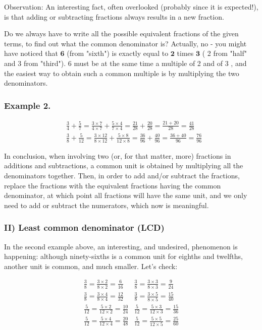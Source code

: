 \documentclass{ximera}
\begin{document}
Observation: An interesting fact, often overlooked (probably since it is expected!), is that adding or subtracting fractions always results in a new fraction.

Do we always have to write all the possible equivalent fractions of the given terms, to find out what the common denominator is? Actually, no - you might have noticed that $\mathbf{6}$ (from "sixth") is exactly equal to $\mathbf{2}$ times $\mathbf{3}$ ( 2 from "half" and 3 from "third"). 6 must be at the same time a multiple of 2 and of 3 , and the easiest way to obtain such a common multiple is by multiplying the two denominators.

\subsubsection*{Example 2.}
$$\begin{aligned}
& \frac{3}{4}+\frac{5}{7}=\frac{3 \times 7}{4 \times 7}+\frac{5 \times 4}{7 \times 4}=\frac{21}{28}+\frac{20}{28}=\frac{21+20}{28}=\frac{41}{28} \\
& \frac{3}{8}+\frac{5}{12}=\frac{3 \times 12}{8 \times 12}+\frac{5 \times 8}{12 \times 8}=\frac{36}{96}+\frac{40}{96}=\frac{36+40}{96}=\frac{76}{96}
\end{aligned}$$

In conclusion, when involving two (or, for that matter, more) fractions in additions and subtractions, a common unit is obtained by multiplying all the denominators together. Then, in order to add and/or subtract the fractions, replace the fractions with the equivalent fractions having the common denominator, at which point all fractions will have the same unit, and we only need to add or subtract the numerators, which now is meaningful.

\subsubsection*{II) Least common denominator (LCD)}
In the second example above, an interesting, and undesired, phenomenon is happening: although ninety-sixths is a common unit for eighths and twelfths, another unit is common, and much smaller. Let's check:

$$\begin{array}{ll}
\frac{3}{8}=\frac{3 \times 2}{8 \times 2}=\frac{6}{16} & \frac{3}{8}=\frac{3 \times 3}{8 \times 3}=\frac{9}{24} \\
\frac{3}{8}=\frac{3 \times 4}{8 \times 4}=\frac{12}{32} & \frac{3}{8}=\frac{3 \times 5}{8 \times 5}=\frac{15}{40} \\
\frac{5}{12}=\frac{5 \times 2}{12 \times 2}=\frac{10}{24} & \frac{5}{12}=\frac{5 \times 3}{12 \times 3}=\frac{15}{36} \\
\frac{5}{12}=\frac{5 \times 4}{12 \times 4}=\frac{20}{48} & \frac{5}{12}=\frac{5 \times 5}{12 \times 5}=\frac{25}{60}
\end{array}$$
\end{document}
